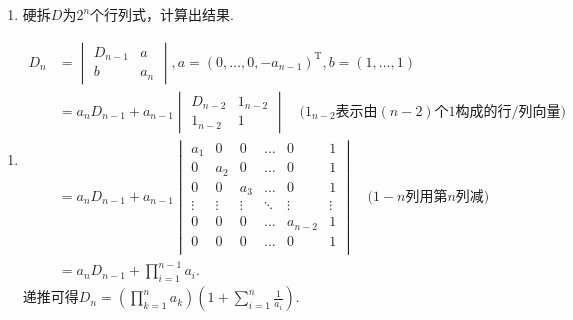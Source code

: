 \begin{exercise}
\begin{exgroup}
\begin{enumerate}
            \item 硬拆$D$为$2^n$个行列式，计算出结果.
        \end{enumerate}
        \begin{answer}
            \begin{enumerate}
                \item \begin{align*}
                          D_n & =\begin{vmatrix}
                                     D_{n-1} & a   \\
                                     b       & a_n
                                 \end{vmatrix},a=(0, \ldots, 0, -a_{n-1})^\mathrm{T}, b=(1, \ldots, 1) \\
                              & =a_nD_{n-1}+a_{n-1}\begin{vmatrix}
                                                       D_{n-2} & 1_{n-2} \\
                                                       1_{n-2} & 1
                                                   \end{vmatrix}
                          \quad \text{($1_{n-2}$表示由$(n-2)$个1构成的行/列向量)}                      \\
                              & =a_nD_{n-1}+a_{n-1}
                          \begin{vmatrix}
                              a_1    & 0      & 0      & \ldots & 0       & 1      \\
                              0      & a_2    & 0      & \ldots & 0       & 1      \\
                              0      & 0      & a_3    & \ldots & 0       & 1      \\
                              \vdots & \vdots & \vdots & \ddots & \vdots  & \vdots \\
                              0      & 0      & 0      & \ldots & a_{n-2} & 1      \\
                              0      & 0      & 0      & \ldots & 0       & 1      \\
                          \end{vmatrix} \quad \text{($1-n$列用第$n$列减)}                         \\
                              & =a_nD_{n-1}+\prod_{i=1}^{n-1}a_i.
                      \end{align*}
                      递推可得$\displaystyle D_n=\left(\prod_{k=1}^na_k\right)
                          \left(1+\sum_{i=1}^n\frac{1}{a_i}\right)$.


\end{enumerate}
\end{answer}
\end{exgroup}
\end{exercise}

